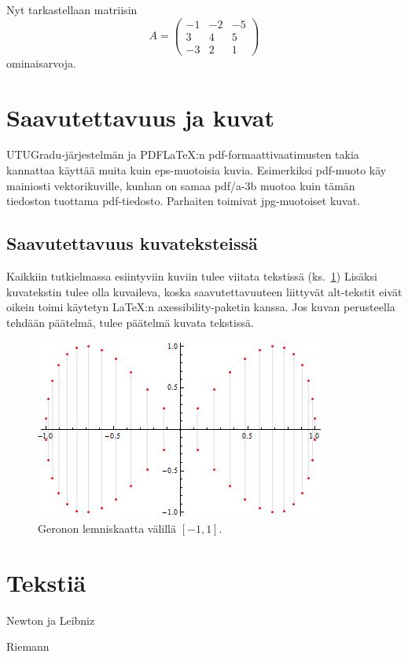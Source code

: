 Nyt tarkastellaan matriisin
\[
A=\left(\begin{array}{rrr} -1 & -2 & -5\\ 3& 4& 5\\ -3 & 2 & 1 \end{array}\right)
\]
ominaisarvoja.

\section{Saavutettavuus ja kuvat}

UTUGradu-järjestelmän ja PDF\LaTeX :n pdf-formaattivaatimusten takia kannattaa käyttää muita kuin eps-muotoisia kuvia. Esimerkiksi pdf-muoto käy mainiosti vektorikuville, kunhan on samaa pdf/a-3b muotoa kuin tämän tiedoston tuottama pdf-tiedosto. Parhaiten toimivat jpg-muotoiset kuvat.



\subsection{Saavutettavuus kuvateksteissä}

Kaikkiin tutkielmassa esiintyviin kuviin tulee viitata tekstissä (ks.~\ref{kuvatus1}) Lisäksi kuvatekstin tulee olla kuvaileva, koska saavutettavuuteen liittyvät alt-tekstit eivät oikein toimi käytetyn \LaTeX :n axessibility-paketin kanssa. Jos kuvan perusteella tehdään päätelmä, tulee päätelmä kuvata tekstissä. 

\begin{figure}[ht]
\begin{center}
\includegraphics[width=.45\textwidth]{siivet.jpg}
\end{center}
\label{kuvatus1}
\caption{Geronon lemniskaatta välillä $[-1,1]$.}
\end{figure}

\section{Tekstiä}

\lipsum[1-10]


 
\begin{thebibliography}{99}

 Newton ja Leibniz

 Riemann

\end{thebibliography}

